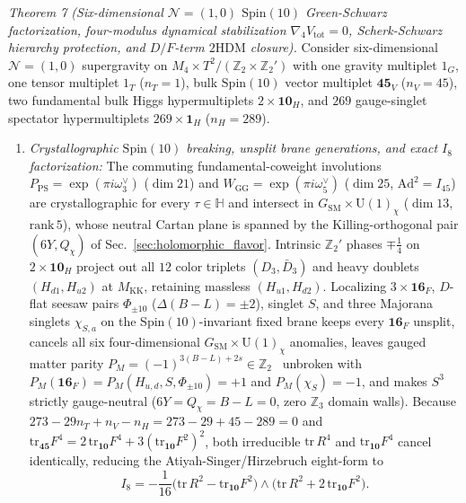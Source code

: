 \documentclass[aps,prd,twocolumn,nofootinbib,floatfix]{revtex4-2}
\begin{document}
\emph{Theorem 7 (Six-dimensional $\mathcal{N}=(1,0)$ $\mathrm{Spin}(10)$ Green-Schwarz factorization, four-modulus dynamical stabilization $\nabla_4 V_{\mathrm{tot}} = 0$, Scherk-Schwarz hierarchy protection, and $D/F$-term $2\mathrm{HDM}$ closure).}
Consider six-dimensional $\mathcal{N}=(1,0)$ supergravity on $M_4 \times T^2/(\mathbb{Z}_2\times\mathbb{Z}_2')$ with one gravity multiplet $1_G$, one tensor multiplet $1_T$ ($n_T = 1$), bulk $\mathrm{Spin}(10)$ vector multiplet $\mathbf{45}_V$ ($n_V = 45$), two fundamental bulk Higgs hypermultiplets $2\times\mathbf{10}_H$, and $269$ gauge-singlet spectator hypermultiplets $269\times\mathbf{1}_H$ ($n_H = 289$).
\begin{enumerate}
    \item \emph{Crystallographic $\mathrm{Spin}(10)$ breaking, unsplit brane generations, and exact $I_8$ factorization:} The commuting fundamental-coweight involutions $P_{\mathrm{PS}} = \exp(\pi i\omega_3^\vee)$ ($\dim 21$) and $W_{\mathrm{GG}} = \exp(\pi i\omega_5^\vee)$ ($\dim 25$, $\mathrm{Ad}^2 = I_{45}$) are crystallographic for every $\tau \in \mathbb{H}$ and intersect in $G_{\mathrm{SM}}\times\mathrm{U}(1)_\chi$ ($\dim 13$, $\mathrm{rank}\,5$), whose neutral Cartan plane is spanned by the Killing-orthogonal pair $(6Y, Q_\chi)$ of Sec.~\ref{sec:holomorphic_flavor}. Intrinsic $\mathbb{Z}_2'$ phases $\mp\frac{1}{4}$ on $2\times\mathbf{10}_H$ project out all $12$ color triplets $(D_3, \bar{D}_3)$ and heavy doublets $(H_{d1}, H_{u2})$ at $M_{\mathrm{KK}}$, retaining massless $(H_{u1}, H_{d2})$. Localizing $3\times\mathbf{16}_F$, $D$-flat seesaw pairs $\Phi_{\pm 10}$ ($\Delta(B-L) = \pm 2$), singlet $S$, and three Majorana singlets $\chi_{S,a}$ on the $\mathrm{Spin}(10)$-invariant fixed brane keeps every $\mathbf{16}_F$ unsplit, cancels all six four-dimensional $G_{\mathrm{SM}}\times\mathrm{U}(1)_\chi$ anomalies, leaves gauged matter parity $P_M = (-1)^{3(B-L)+2s} \in \mathbb{Z}_2$~\cite{Martin1992} unbroken with $P_M(\mathbf{16}_F) = P_M(H_{u,d}, S, \Phi_{\pm 10}) = +1$ and $P_M(\chi_S) = -1$, and makes $S^3$ strictly gauge-neutral ($6Y = Q_\chi = B-L = 0$, zero $\mathbb{Z}_3$ domain walls). Because $273 - 29 n_T + n_V - n_H = 273 - 29 + 45 - 289 = 0$ and $\mathrm{tr}_{\mathbf{45}} F^4 = 2\,\mathrm{tr}_{\mathbf{10}} F^4 + 3(\mathrm{tr}_{\mathbf{10}} F^2)^2$, both irreducible $\mathrm{tr}\,R^4$ and $\mathrm{tr}_{\mathbf{10}} F^4$ cancel identically, reducing the Atiyah-Singer/Hirzebruch eight-form to
    \begin{equation}
    \label{eq:i8_spin10_factor}
    I_8 = -\frac{1}{16}\bigl(\mathrm{tr}\,R^2 - \mathrm{tr}_{\mathbf{10}} F^2\bigr)\wedge\bigl(\mathrm{tr}\,R^2 + 2\,\mathrm{tr}_{\mathbf{10}} F^2\bigr).

\end{equation}
\end{enumerate}
\end{document}
